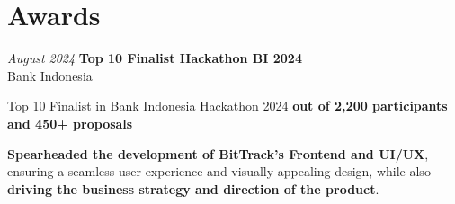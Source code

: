 \documentclass[../main.tex]{subfiles}
\begin{document}
\section{Awards}

\begin{twocolentry}{
    \textit{August 2024}
}
    \textbf{Top 10 Finalist Hackathon BI 2024}\\
    Bank Indonesia
\end{twocolentry}
\vspace{0.10 cm}
\begin{onecolentry}
\begin{highlights}
    \item Top 10 Finalist in Bank Indonesia Hackathon 2024 \textbf{out of 2,200 participants and 450+ proposals}
    \item \textbf{Spearheaded the development of BitTrack's Frontend and UI/UX}, ensuring a seamless user experience and visually appealing design, while also \textbf{driving the business strategy and direction of the product}.
\end{highlights}
\end{onecolentry}
\end{document}
